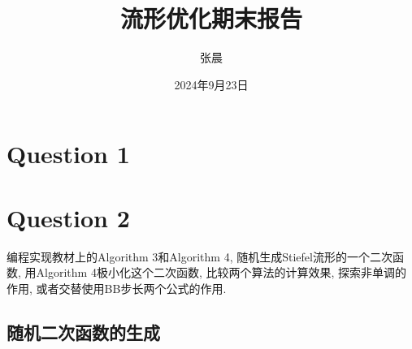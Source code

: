 \documentclass[UTF8]{ctexart}
\begin{document}
\title{流形优化期末报告}
\author{张晨}
\date{2024年9月23日}
\maketitle

\section{Question 1}

\section{Question 2}

编程实现教材上的Algorithm 3和Algorithm 4, 随机生成Stiefel流形的一个二次函数, 用Algorithm 4极小化这个二次函数, 比较两个算法的计算效果, 探索非单调的作用, 或者交替使用BB步长两个公式的作用. \par

\subsection{随机二次函数的生成}
\end{document}
